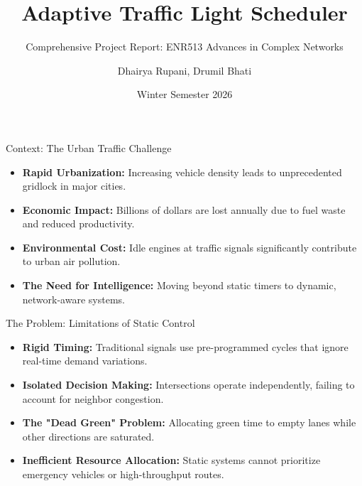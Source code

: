 \documentclass{beamer}
\title[Adaptive Traffic Scheduler]{Adaptive Traffic Light Scheduler}
\subtitle{Comprehensive Project Report: ENR513 Advances in Complex Networks}
\author[Rupani \& Bhati]{Dhairya Rupani, Drumil Bhati}
\institute[Ahmedabad University]{Ahmedabad University}
\date[Winter 2026]{Winter Semester 2026}
\begin{document}
\begin{frame}
    \titlepage
\end{frame}

\begin{frame}{Context: The Urban Traffic Challenge}
    \begin{itemize}
        \item \textbf{Rapid Urbanization:} Increasing vehicle density leads to unprecedented gridlock in major cities. \pause
        \item \textbf{Economic Impact:} Billions of dollars are lost annually due to fuel waste and reduced productivity. \pause
        \item \textbf{Environmental Cost:} Idle engines at traffic signals significantly contribute to urban air pollution. \pause
        \item \textbf{The Need for Intelligence:} Moving beyond static timers to dynamic, network-aware systems.
    \end{itemize}
\end{frame}

\begin{frame}{The Problem: Limitations of Static Control}
    \begin{itemize}
        \item \textbf{Rigid Timing:} Traditional signals use pre-programmed cycles that ignore real-time demand variations. \pause
        \item \textbf{Isolated Decision Making:} Intersections operate independently, failing to account for neighbor congestion. \pause
        \item \textbf{The "Dead Green" Problem:} Allocating green time to empty lanes while other directions are saturated. \pause
        \item \textbf{Inefficient Resource Allocation:} Static systems cannot prioritize emergency vehicles or high-throughput routes.
    \end{itemize}
\end{frame}
\end{document}
